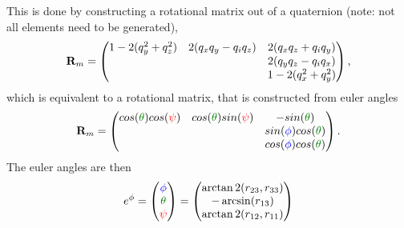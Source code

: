 This is done by constructing a rotational matrix out of a quaternion (note: not all elements need to be generated), 
\begin{equation}
\mathbf{R}_m = \begin{pmatrix}
1-2(q_y^2 + q_z^2)		& 2(q_xq_y-q_iq_z)		& 2(q_xq_z + q_iq_y) \\
						& 						& 2(q_yq_z - q_iq_x) \\
						& 						& 1-2(q_x^2 + q_y^2)	
\end{pmatrix},
\end{equation}
which is equivalent to a rotational matrix, that is constructed from euler angles
\begin{equation}
\mat R_m = \begin{pmatrix}
cos(\Pitch)cos(\Yaw)	& cos(\Pitch)sin(\Yaw)	& -sin(\Pitch)			\\
						& 						& sin(\Roll)cos(\Pitch)	\\
						& 						& cos(\Roll)cos(\Pitch)
\end{pmatrix}.
\end{equation}
The euler angles are then
\begin{equation}
\eu e = \begin{pmatrix}\Roll \\ \Pitch \\ \Yaw \end{pmatrix} = 
\begin{pmatrix}
\arctan2(r_{23}, r_{33}) \\
-\arcsin(r_{13}) \\
\arctan2(r_{12}, r_{11})
\end{pmatrix}
\end{equation}
